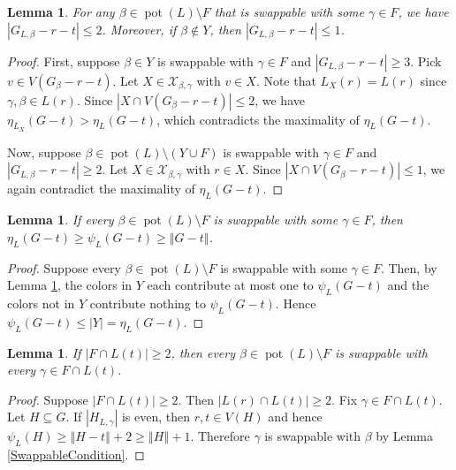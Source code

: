 \documentclass[12pt]{article}
\theoremstyle{plain}
\newtheorem{lem}[thm]{Lemma}
\theoremstyle{definition}
\theoremstyle{remark}
\newcommand{\fancy}[1]{\mathcal{#1}}
\newcommand{\card}[1]{\left|#1\right|}
\newcommand{\size}[1]{\left\Vert#1\right\Vert}
\newcommand{\parens}[1]{\left( #1 \right)}
\newcommand{\pot}{\operatorname{pot}}
\def\X{\fancy{X}}
\begin{document}
	\begin{lem}\label{SwappersAreSparse}
		For any $\beta \in \pot(L) \setminus F$ that is swappable with some $\gamma \in F$, we have $\card{G_{L,\beta} - r - t} \le 2$.  Moreover, if $\beta \not \in Y$, then $\card{G_{L,\beta} - r - t} \le 1$.
	\end{lem}
	\begin{proof}
		First, suppose $\beta \in Y$ is swappable with $\gamma \in F$ and $\card{G_{L,\beta} - r - t} \ge 3$.  Pick $v \in V(G_\beta - r - t)$.  Let $X \in \X_{\beta,\gamma}$ with $v \in X$.  Note that $L_X(r) = L(r)$ since $\gamma, \beta \in L(r)$.  Since $\card{X \cap V(G_\beta - r - t)} \le 2$,  we have $\eta_{L_X}(G - t) > \eta_L(G - t)$, which contradicts the maximality of $\eta_L(G - t)$.
		
		Now, suppose $\beta \in \pot(L) \setminus \parens{Y \cup F}$ is swappable with $\gamma \in F$ and $\card{G_{L,\beta} - r - t} \ge 2$.  Let $X \in \X_{\beta,\gamma}$ with $r \in X$.  Since $\card{X \cap V(G_\beta - r - t)} \le 1$, we again contradict the maximality of $\eta_L(G - t)$.
	\end{proof}
	
	\begin{lem}\label{AllSwappableLowPsi}
		If every $\beta \in \pot(L) \setminus F$ is swappable with some $\gamma \in F$, then $\eta_L(G-t) \ge \psi_L(G - t) \ge \size{G - t}$.
	\end{lem}
	\begin{proof}
		Suppose every $\beta \in \pot(L) \setminus F$ is swappable with some $\gamma \in F$.  Then, by Lemma \ref{SwappersAreSparse}, the colors in $Y$ each contribute at most one to $\psi_L(G - t)$ and the colors not in $Y$ contribute nothing to $\psi_L(G - t)$.  Hence $\psi_L(G - t) \le \card{Y} = \eta_L(G-t)$.
	\end{proof}
	

	
	\begin{lem}\label{FIntersectingLt}
		If $\card{F \cap L(t)} \ge 2$, then every $\beta \in \pot(L) \setminus F$ is swappable with every $\gamma \in F \cap L(t)$.
	\end{lem}
	\begin{proof}
		Suppose $\card{F \cap L(t)} \ge 2$.  Then $\card{L(r) \cap L(t)} \ge 2$.  Fix $\gamma \in F \cap L(t)$. Let $H \subseteq G$.  If $\card{H_{L, \gamma}}$ is even, then $r, t \in V(H)$ and hence $\psi_L(H) \ge \size{H-t} + 2 \ge \size{H} + 1$.  Therefore $\gamma$ is swappable with $\beta$ by Lemma \ref{SwappableCondition}.
	\end{proof}
	
\end{document}
